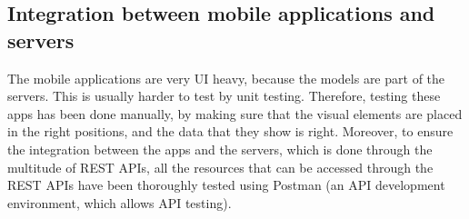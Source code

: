 \subsection{Integration between mobile applications and servers}
The mobile applications are very UI heavy, because the models are part of the servers. This is usually harder to test by unit testing. Therefore, testing these apps has been done manually, by making sure that the visual elements are placed in the right positions, and the data that they show is right. Moreover, to ensure the integration between the apps and the servers, which is done through the multitude of REST APIs, all the resources that can be accessed through the REST APIs have been thoroughly tested using Postman (an API development environment, which allows API testing). 
